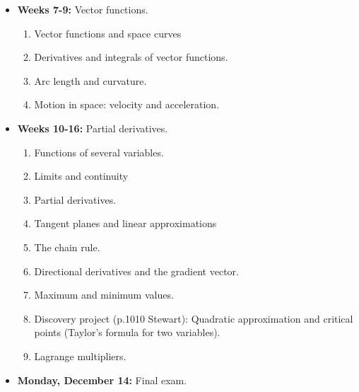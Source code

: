 \documentclass[10pt]{article}
\begin{document}
\begin{itemize}
  \item \textbf{Weeks 7-9:} Vector functions.
  \begin{enumerate}
    \item Vector functions and space curves
    \item Derivatives and integrals of vector functions.
    \item Arc length and curvature.
    \item Motion in space: velocity and acceleration.
  \end{enumerate}
  \item \textbf{Weeks 10-16:} Partial derivatives.
  \begin{enumerate}
    \item Functions of several variables.
    \item Limits and continuity
    \item Partial derivatives.
    \item Tangent planes and linear approximations
    \item The chain rule.
    \item Directional derivatives and the gradient vector.
    \item Maximum and minimum values.
    \item Discovery project (p.1010 Stewart): Quadratic approximation and critical
    points (Taylor’s formula for two variables).
    \item Lagrange multipliers.
  \end{enumerate}
  \item \textbf{Monday, December 14:} Final exam.
\end{itemize} 
\end{document}
